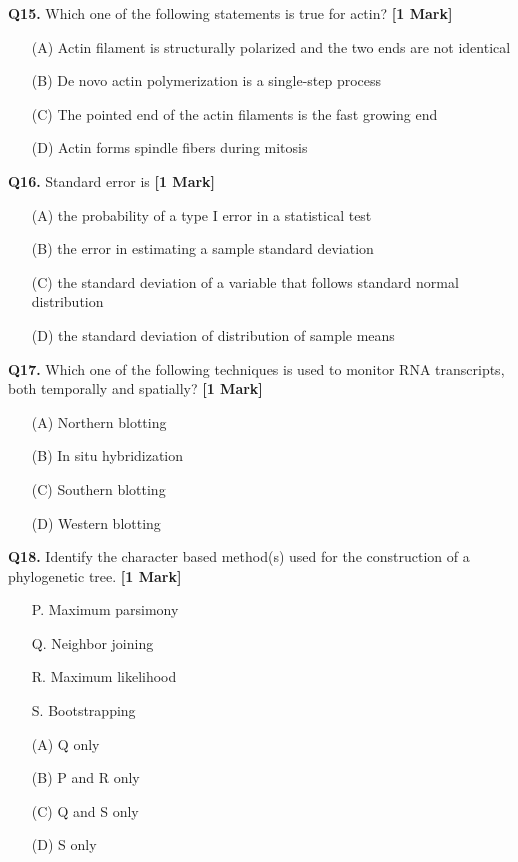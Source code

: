 \documentclass[11pt]{article}
\newcommand{\questiona}[2]{
    \noindent\textbf{Q#2.} #1 \hfill \textbf{[1 Mark]}
}
\begin{document}
\questiona{Which one of the following statements is true for actin?}{15}
\begin{enumerate}
    \item[(A)] Actin filament is structurally polarized and the two ends are not identical  
    \item[(B)] De novo actin polymerization is a single-step process  
    \item[(C)] The pointed end of the actin filaments is the fast growing end  
    \item[(D)] Actin forms spindle fibers during mitosis  
\end{enumerate}
\vspace{0.5cm}

\questiona{Standard error is}{16}
\begin{enumerate}
    \item[(A)] the probability of a type I error in a statistical test  
    \item[(B)] the error in estimating a sample standard deviation  
    \item[(C)] the standard deviation of a variable that follows standard normal distribution  
    \item[(D)] the standard deviation of distribution of sample means  
\end{enumerate}
\vspace{0.5cm}

\questiona{Which one of the following techniques is used to monitor RNA transcripts, both temporally and spatially?}{17}
\begin{enumerate}
    \item[(A)] Northern blotting  
    \item[(B)] In situ hybridization  
    \item[(C)] Southern blotting  
    \item[(D)] Western blotting  
\end{enumerate}
\vspace{0.5cm}

\questiona{Identify the character based method(s) used for the construction of a phylogenetic tree.}{18}
\begin{enumerate}
    \item[P.] Maximum parsimony  
    \item[Q.] Neighbor joining  
    \item[R.] Maximum likelihood  
    \item[S.] Bootstrapping  
    \item[(A)] Q only  
    \item[(B)] P and R only  
    \item[(C)] Q and S only  
    \item[(D)] S only  
\end{enumerate}
\vspace{0.5cm}
\end{document}

